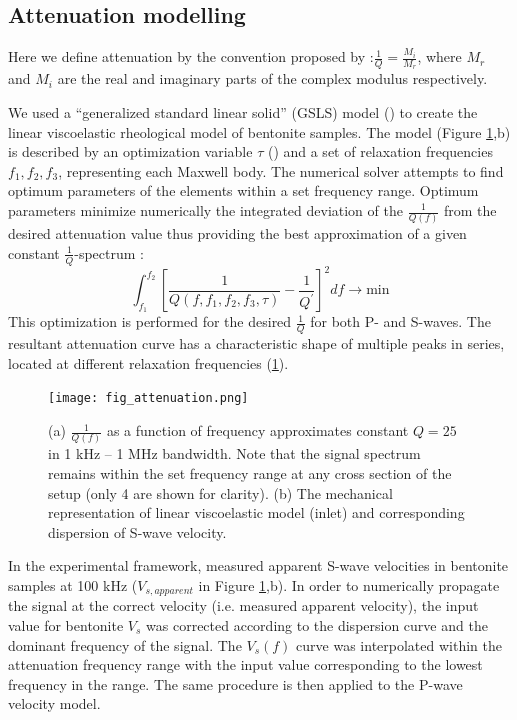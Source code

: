 \documentclass[letterpaper,11pt]{article}
\begin{document}
\subsection*{Attenuation modelling} 
Here we define attenuation by the convention proposed by \cite{oconnell_measures_1978}:$\frac{1}{Q}=\frac{M_{i}}{M_{r}}$, where $M_{r}$ and $M_{i}$ are the real and imaginary parts of the complex modulus respectively.

We used a ``generalized standard linear solid'' (GSLS) model (\cite{liu_velocity_1976}) to create the linear viscoelastic rheological model of bentonite samples. 
The model (Figure \ref{fig:attenuation},b) is described by an optimization variable $\tau$ (\cite{blanch_modeling_1995}) and a set of relaxation frequencies $f_{1},f_{2},f_{3}$, representing each Maxwell body. The numerical solver attempts to find optimum parameters of the elements within a set frequency range. Optimum parameters minimize numerically the integrated deviation of the $\frac{1}{Q(f)}$ from the desired attenuation value thus providing the best approximation of a given constant $\frac{1}{Q}$-spectrum :
 \begin{equation}
 \int_{f_{1}}^{f_{2}} [\frac{1}{Q(f,f_{1},f_{2},f_{3},\tau)} - \frac{1}{Q^{'}}]^{2} df \longrightarrow \mathrm{min}
 \label{eq:att_minim}
 \end{equation}
This optimization is performed for the desired $\frac{1}{Q}$ for both P- and S-waves. The resultant attenuation curve has a characteristic shape of multiple peaks in series, located at different relaxation frequencies (\ref{fig:attenuation}).
\begin{figure}
\centering
\texttt{[image: fig\_attenuation.png]}
 \caption{(a) $\frac{1}{Q(f)}$ as a function of frequency approximates constant $Q=25$ in 1 kHz -- 1 MHz bandwidth. Note that the signal spectrum remains within the set frequency range at any cross section of the setup (only 4 are shown for clarity). (b) The mechanical representation of linear viscoelastic model (inlet) and corresponding dispersion of S-wave velocity.}
 \label{fig:attenuation}
\end{figure}
In the experimental framework, \cite{tisato_laboratory_2013} measured apparent S-wave velocities in bentonite samples at 100 kHz ($V_{s,apparent}$ in Figure \ref{fig:attenuation},b). In order to numerically propagate the signal at the correct velocity (i.e. measured apparent velocity), the input value for bentonite $V_{s}$ was corrected according to the dispersion curve and the dominant frequency of the signal. The $V_{s}(f)$ curve was interpolated within the attenuation frequency range with the input value corresponding to the lowest frequency in the range. The same procedure is then applied to the P-wave velocity model.
\end{document}
